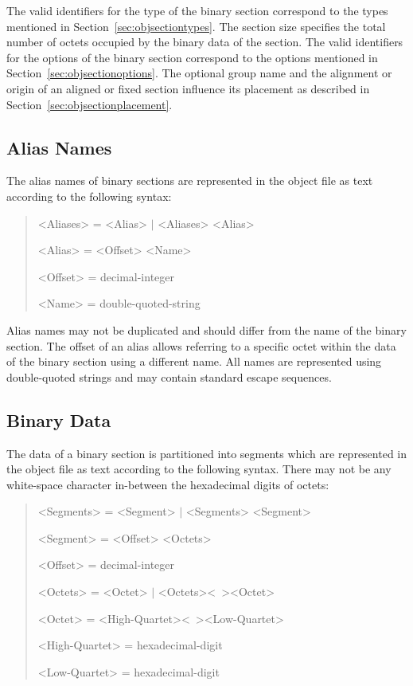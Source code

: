 The valid identifiers for the type of the binary section correspond to the types mentioned in Section~\ref{sec:objsectiontypes}.
The section size specifies the total number of octets occupied by the binary data of the section.
The valid identifiers for the options of the binary section correspond to the options mentioned in Section~\ref{sec:objsectionoptions}.
The optional group name and the alignment or origin of an aligned or fixed section influence its placement as described in Section~\ref{sec:objsectionplacement}.

\subsection{Alias Names}

The alias names of binary sections are represented in the object file as text according to the following syntax:

\begin{quote}\begin{grammar}
<Aliases> = <Alias> $\mid$ <Aliases> <Alias> \par
<Alias> = <Offset> <Name> \par
<Offset> = decimal-integer \par
<Name> = double-quoted-string \par
\end{grammar}\end{quote}

Alias names may not be duplicated and should differ from the name of the binary section.
The offset of an alias allows referring to a specific octet within the data of the binary section using a different name.
All names are represented using double-quoted strings and may contain standard escape sequences.

\subsection{Binary Data}

The data of a binary section is partitioned into segments which are represented in the object file as text according to the following syntax.
There may not be any white-space character in-between the hexadecimal digits of octets:

\begin{quote}\begin{grammar}
<Segments> = <Segment> $\mid$ <Segments> <Segment> \par
<Segment> = <Offset> <Octets> \par
<Offset> = decimal-integer \par
<Octets> = <Octet> $\mid$ <Octets><\ ><Octet> \par
<Octet> = <High-Quartet><\ ><Low-Quartet> \par
<High-Quartet> = hexadecimal-digit \par
<Low-Quartet> = hexadecimal-digit \par
\end{grammar}\end{quote}

